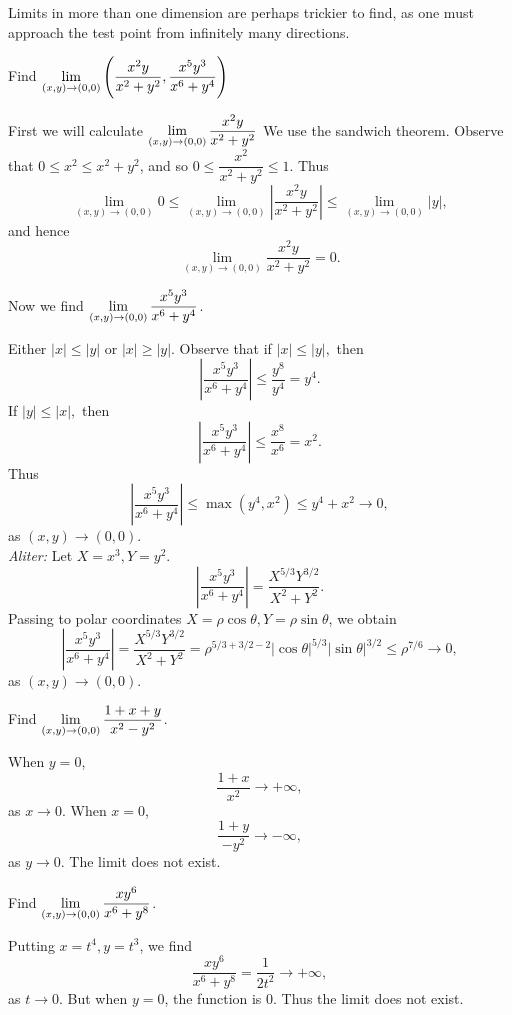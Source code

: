 Limits in more than one
dimension are perhaps trickier to find, as one must approach the
test point from infinitely many directions.
\begin{exa}
Find $\displaystyle{\lim\limits_{(x, y) \rightarrow (0,0)} \left(  \dfrac{x^2y}{x^2 + y^2}, \dfrac{x^5y^3}{x^6 + y^4}\right)}$

\label{exa:limits_1}  \end{exa}
\begin{solu} 
First we will calculate $\displaystyle{\lim\limits_{(x, y) \rightarrow (0,0)}\dfrac{x^2y}{x^2 + y^2}}$
We use the sandwich theorem. Observe that $ 0 \leq x^2 \leq
x^2 + y^2$, and so $0 \leq \dfrac{x^2}{x^2 + y^2}\leq 1$. Thus
$$ \lim\limits_{(x, y)\rightarrow (0,0)} 0
\leq  \lim\limits_{(x, y)\rightarrow (0,0)} \left|\dfrac{x^2y}{x^2 +
y^2}\right|\leq
 \lim\limits_{(x, y)\rightarrow (0,0)}|y|,$$ and hence
 $$\lim\limits_{(x, y)\rightarrow (0,0)} \dfrac{x^2y}{x^2 + y^2} = 0.$$
 
 
 Now we find  $\displaystyle{\lim\limits_{(x, y)\rightarrow (0,0)}\dfrac{x^5y^3}{x^6 + y^4}}$.
 
 Either $|x| \leq |y|$ or $|x| \geq |y|$. Observe that if $|x| \leq |y|,$ then
$$\left|\dfrac{x^5y^3}{x^6 + y^4}\right| \leq \dfrac{y^8}{y^4} =
y^4.$$If $|y| \leq |x| ,$ then
$$\left|\dfrac{x^5y^3}{x^6 + y^4}\right| \leq \dfrac{x^8}{x^6} =
x^2.$$Thus
$$\left|\dfrac{x^5y^3}{x^6 + y^4}\right| \leq \max(y^4, x^2) \leq y^4 + x^2 \longrightarrow 0,$$
as $(x, y)\rightarrow (0,0).$ \\
{\em Aliter:} Let $X = x^3, Y = y^2$.
$$\left|\dfrac{x^5y^3}{x^6 + y^4}\right| = \dfrac{X^{5/3}Y^{3/2}}{X^2 +
Y^2}.$$Passing to polar coordinates $X = \rho\cos\theta, Y =
\rho\sin\theta$, we obtain
$$\left|\dfrac{x^5y^3}{x^6 + y^4}\right| = \dfrac{X^{5/3}Y^{3/2}}{X^2 +
Y^2} = \rho ^{5/3 + 3/2 - 2}|\cos\theta|^{5/3}|\sin\theta|^{3/2}
\leq \rho^{7/6} \rightarrow 0,$$as $(x, y)\rightarrow (0,0).$
 
 \end{solu}







\begin{exa}\label{exa:limits_3} Find $\displaystyle{\lim\limits_{(x, y)\rightarrow (0,0)}\dfrac{1 + x + y}{x^2 - y^2}}$. \end{exa}
\begin{solu} When $y = 0$,
$$\dfrac{1 + x}{x^2} \rightarrow +\infty,$$as $x\rightarrow 0$.
When $x = 0$,
$$\dfrac{1 + y}{-y^2} \rightarrow -\infty,$$as $y\rightarrow 0$.
The limit does not exist.
\end{solu}
\begin{exa}\label{exa:limits_4} Find $\displaystyle{\lim\limits_{(x, y)\rightarrow (0,0)}\dfrac{xy^6}{x^6 + y^8}}$. \end{exa}
\begin{solu} Putting $x = t^4, y = t^3$, we find
$$\dfrac{xy^6}{x^6 + y^8} = \dfrac{1}{2t^2} \rightarrow +\infty,$$as
$t \rightarrow 0.$ But when $y = 0$, the function is $0$. Thus the
limit does not exist. \end{solu}

